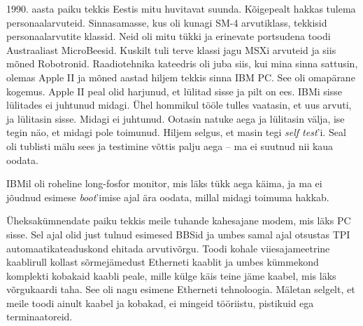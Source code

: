 1990. aasta paiku tekkis Eestis 
mitu huvitavat suunda. Kõigepealt hakkas tulema 
personaalarvuteid. Sinnasamasse, kus oli kunagi SM-4 arvutiklass, tekkisid 
personaalarvutite klassid. Neid oli mitu tükki ja erinevate portsudena 
toodi Austraaliast MicroBeesid. Kuskilt tuli terve klassi jagu MSXi 
arvuteid ja siis mõned 
Robotronid. 
Raadiotehnika kateedris oli juba siis, kui mina sinna sattusin, olemas 
Apple II ja mõned aastad hiljem tekkis sinna IBM 
PC. See oli omapärane kogemus. Apple II peal olid 
harjunud, et lülitad sisse ja pilt on ees. IBMi sisse lülitades ei juhtunud midagi. Ühel hommikul tööle tulles vaatasin, et uus 
arvuti, ja lülitasin sisse. Midagi ei juhtunud. Ootasin natuke aega ja lülitasin välja, ise 
tegin näo, et midagi pole toimunud. Hiljem selgus, et masin tegi \emph{self 
test}'i. Seal oli tublisti mälu sees ja testimine võttis palju aega -- ma ei 
suutnud nii kaua oodata. 


IBMil oli roheline long-fosfor monitor, mis läks tükk 
aega käima, ja ma ei jõudnud esimese \emph{boot}'imise ajal ära oodata, millal 
midagi toimuma hakkab.

Üheksakümnendate paiku tekkis meile tuhande kahesajane modem, mis läks 
PC sisse. Sel ajal olid just tulnud esimesed BBSid ja umbes samal ajal otsustas TPI 
automaatikateaduskond 
ehitada arvutivõrgu. Toodi kohale viiesajameetrine kaablirull 
kollast sõrmejämedust Etherneti kaablit ja umbes kümmekond komplekti 
kobakaid kaabli peale, mille külge käis teine jäme kaabel, 
mis läks võrgukaardi taha. See oli nagu esimene Etherneti tehnoloogia. 
Mäletan selgelt, et meile toodi ainult kaabel ja kobakad, ei mingeid tööriistu, pistikuid ega terminaatoreid.

